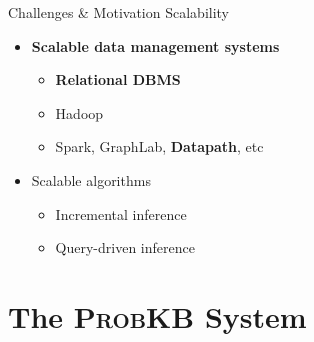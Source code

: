 \documentclass[onlymath,xcolor=pdftex,dvipsnames,table]{beamer}
\newcommand{\probkb}{\textsc{ProbKB}\xspace}
\begin{document}
{
\begin{frame}{Challenges \& Motivation}
{\large Scalability}
\vspace{-30pt}
\begin{itemize}
  \item \textbf{\color{red}Scalable data management systems}
    \begin{itemize}
      \item \textbf{\color{red}Relational DBMS}
      \item Hadoop
      \item Spark, GraphLab, \textbf{\color{red}Datapath}, etc
    \end{itemize}
  \item Scalable algorithms
    \begin{itemize}
      \item Incremental inference
      \item Query-driven inference
    \end{itemize}
\end{itemize}
\end{frame}}


\section{The \probkb System}
\end{document}
